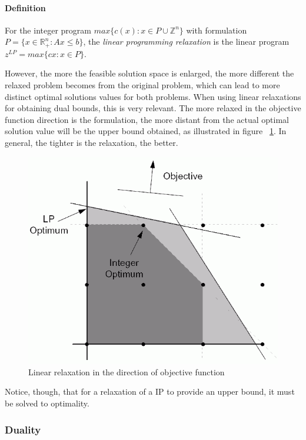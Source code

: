 \paragraph{Definition}
For the integer program $max\{c(x): x \in P \cup \mathbb{Z}^n\}$ with formulation $P = \{x \in \mathbb{R}^{n}_{+}: Ax \le b\}$, the \textit{linear programming relaxation} is the linear program $z^{LP} = max\{cx: x \in P\}$.

However, the more the feasible solution space is enlarged, the more different the relaxed problem becomes from the original problem, which can lead to more distinct optimal solutions values for both problems. When using linear relaxations for obtaining dual bounds, this is very relevant. The more relaxed in the objective function direction is the formulation, the more distant from the actual optimal solution value will be the upper bound obtained, as illustrated in figure ~\ref{fig:objDirection}. In general, the tighter is the relaxation, the better.

\begin{figure}[h]
\centering
\hfill\includegraphics[scale=0.6]{figures/linearForm2.png}
\caption{Linear relaxation in the direction of objective function}
\label{fig:objDirection}
\end{figure}

Notice, though, that for a relaxation of a IP to provide an upper bound, it must be solved to optimality.

\subsubsection{Duality}

